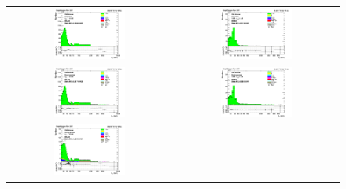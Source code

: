 \begin{figure}[htp]
  \begin{center}
    \begin{tabular}{cc}
      \includegraphics[width=0.45\textwidth]{figures/Zprime/2017/ScaleFactor/SameSign/nominal/stack_Et_Barrel_probes_PUW.png} &
      \includegraphics[width=0.45\textwidth]{figures/Zprime/2017/ScaleFactor/SameSign/nominal/stack_Et_Endcap_probes_PUW.png} \\
      \includegraphics[width=0.45\textwidth]{figures/Zprime/2017/ScaleFactor/SameSign/nominal/stack_Et_Barrel_pass_PUW.png} &
      \includegraphics[width=0.45\textwidth]{figures/Zprime/2017/ScaleFactor/SameSign/nominal/stack_Et_Endcap_pass_PUW.png}\\
      \includegraphics[width=0.45\textwidth]{figures/Zprime/2017/ScaleFactor/SameSign/nominal/stack_Et_Barrel_fail_PUW.png} &

\end{tabular}
\end{center}
\end{figure}
